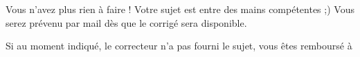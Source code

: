 ﻿Vous n’avez plus rien à faire ! Votre sujet est entre des mains compétentes ;)
Vous serez prévenu par mail dès que le corrigé sera disponible.

Si au moment indiqué, le correcteur n’a pas fourni le sujet, vous êtes remboursé à %